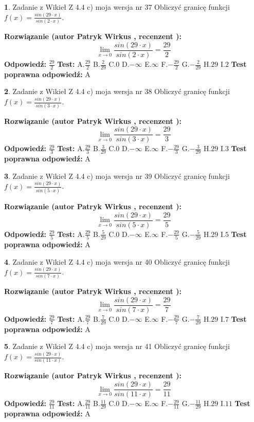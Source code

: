 \documentclass[12pt, a4paper]{article}
\theoremstyle{definition} %
\newtheorem{zad}{}
\newcommand{\zadStart}[1]{\begin{zad}#1\newline}
\newcommand{\zadStop}{\end{zad}}
\newcommand{\rozwStart}[2]{\noindent \textbf{Rozwiązanie (autor #1 , recenzent #2): }\newline}
\newcommand{\rozwStop}{\newline}
\newcommand{\odpStart}{\noindent \textbf{Odpowiedź:}\newline}
\newcommand{\odpStop}{\newline}
\newcommand{\testStart}{\noindent \textbf{Test:}\newline}
\newcommand{\testStop}{\newline}
\newcommand{\kluczStart}{\noindent \textbf{Test poprawna odpowiedź:}\newline}
\newcommand{\kluczStop}{\newline}
\begin{document}
\zadStart{Zadanie z Wikieł Z 4.4 c) moja wersja nr 37}
Obliczyć granicę funkcji $f(x)=\frac{sin(29\cdot x)}{sin(2\cdot x)}$.
\zadStop
\rozwStart{Patryk Wirkus}{}
$$\lim\limits_{x\to 0}\frac{sin(29\cdot x)}{sin(2\cdot x)}=
\frac{29}{2}$$
\rozwStop
\odpStart
$\frac{29}{2}$
\odpStop
\testStart
A.$\frac{29}{2}$
B.$\frac{2}{29}$
C.$0$
D.$-\infty$
E.$\infty$
F.$-\frac{29}{2}$
G.$-\frac{2}{29}$
H.$29$
I.$2$
\testStop
\kluczStart
A
\kluczStop



\zadStart{Zadanie z Wikieł Z 4.4 c) moja wersja nr 38}
Obliczyć granicę funkcji $f(x)=\frac{sin(29\cdot x)}{sin(3\cdot x)}$.
\zadStop
\rozwStart{Patryk Wirkus}{}
$$\lim\limits_{x\to 0}\frac{sin(29\cdot x)}{sin(3\cdot x)}=
\frac{29}{3}$$
\rozwStop
\odpStart
$\frac{29}{3}$
\odpStop
\testStart
A.$\frac{29}{3}$
B.$\frac{3}{29}$
C.$0$
D.$-\infty$
E.$\infty$
F.$-\frac{29}{3}$
G.$-\frac{3}{29}$
H.$29$
I.$3$
\testStop
\kluczStart
A
\kluczStop



\zadStart{Zadanie z Wikieł Z 4.4 c) moja wersja nr 39}
Obliczyć granicę funkcji $f(x)=\frac{sin(29\cdot x)}{sin(5\cdot x)}$.
\zadStop
\rozwStart{Patryk Wirkus}{}
$$\lim\limits_{x\to 0}\frac{sin(29\cdot x)}{sin(5\cdot x)}=
\frac{29}{5}$$
\rozwStop
\odpStart
$\frac{29}{5}$
\odpStop
\testStart
A.$\frac{29}{5}$
B.$\frac{5}{29}$
C.$0$
D.$-\infty$
E.$\infty$
F.$-\frac{29}{5}$
G.$-\frac{5}{29}$
H.$29$
I.$5$
\testStop
\kluczStart
A
\kluczStop



\zadStart{Zadanie z Wikieł Z 4.4 c) moja wersja nr 40}
Obliczyć granicę funkcji $f(x)=\frac{sin(29\cdot x)}{sin(7\cdot x)}$.
\zadStop
\rozwStart{Patryk Wirkus}{}
$$\lim\limits_{x\to 0}\frac{sin(29\cdot x)}{sin(7\cdot x)}=
\frac{29}{7}$$
\rozwStop
\odpStart
$\frac{29}{7}$
\odpStop
\testStart
A.$\frac{29}{7}$
B.$\frac{7}{29}$
C.$0$
D.$-\infty$
E.$\infty$
F.$-\frac{29}{7}$
G.$-\frac{7}{29}$
H.$29$
I.$7$
\testStop
\kluczStart
A
\kluczStop



\zadStart{Zadanie z Wikieł Z 4.4 c) moja wersja nr 41}
Obliczyć granicę funkcji $f(x)=\frac{sin(29\cdot x)}{sin(11\cdot x)}$.
\zadStop
\rozwStart{Patryk Wirkus}{}
$$\lim\limits_{x\to 0}\frac{sin(29\cdot x)}{sin(11\cdot x)}=
\frac{29}{11}$$
\rozwStop
\odpStart
$\frac{29}{11}$
\odpStop
\testStart
A.$\frac{29}{11}$
B.$\frac{11}{29}$
C.$0$
D.$-\infty$
E.$\infty$
F.$-\frac{29}{11}$
G.$-\frac{11}{29}$
H.$29$
I.$11$
\testStop
\kluczStart
A
\kluczStop
\end{document}
